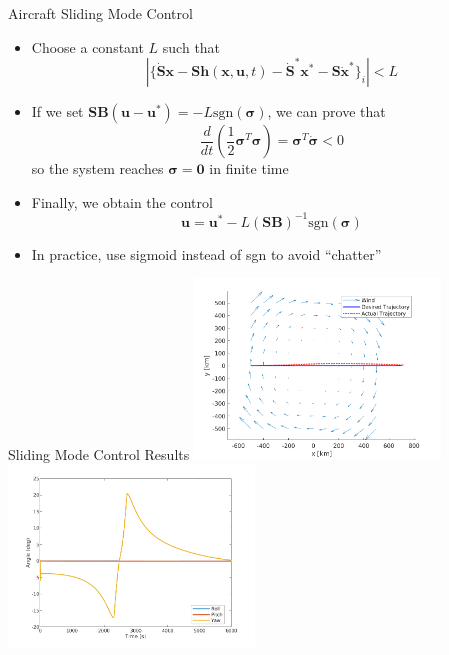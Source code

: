 \documentclass[aspectratio=169]{beamer}
\begin{document}
\begin{frame}{Aircraft Sliding Mode Control}
    \begin{itemize}
      \item Choose a constant $L$ such that
        \begin{equation*}
            |\{\dot{\mathbf{S}}\mathbf{x} - \mathbf{S}\mathbf{h}(\mathbf{x},\mathbf{u},t) - \dot{\mathbf{S}}^*\mathbf{x}^* - \mathbf{S}\dot{\mathbf{x}}^*\}_i| < L
        \end{equation*}
        \item If we set $\mathbf{S}\mathbf{B} (\mathbf{u} - \mathbf{u}^*) = -L \mathrm{sgn}(\boldsymbol{\sigma})$, we can prove that
        \begin{equation*}
            \frac{d}{dt}\left(\frac{1}{2}\boldsymbol{\sigma}^T\boldsymbol{\sigma}\right) = \boldsymbol{\sigma}^T\dot{\boldsymbol{\sigma}} < 0
        \end{equation*}
        so the system reaches $\boldsymbol{\sigma}=\mathbf{0}$ in finite time
    \item Finally, we obtain the control
    \begin{equation*}
        \mathbf{u} = \mathbf{u}^* -L (\mathbf{S}\mathbf{B})^{-1} \mathrm{sgn}(\boldsymbol{\sigma})
    \end{equation*}
        \item In practice, use sigmoid instead of sgn to avoid ``chatter''
        \end{itemize}
\end{frame}


\begin{frame}{Sliding Mode Control Results}
    \centering
    \includegraphics[width=0.49\textwidth]{sm_hurricane.png} 
    \includegraphics[width=0.49\textwidth]{sm_rpy.png}
\end{frame}
\end{document}
